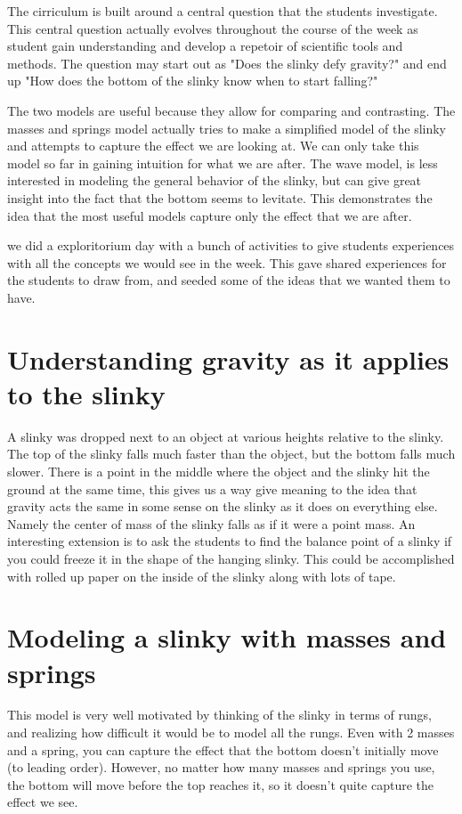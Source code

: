 \documentclass[aps,pre,10pt,superscriptaddress,showpacs,amsmath,amssymb,nofootinbib]{revtex4-1}
\begin{document}
The cirriculum is built around a central question that the students investigate.
 This central question actually evolves throughout the course of the week as
student gain understanding and develop a repetoir of scientific tools and
methods.  The question may start out as "Does the slinky defy gravity?" and end
up  "How does the bottom of the slinky know when to start falling?"

The two models are useful because they allow for comparing and contrasting. The
masses and springs model actually tries to make a simplified model of the slinky
and attempts to capture the effect we are looking at.  We can only take this
model so far in gaining intuition for what we are after.    The wave model, is
less interested in modeling the general behavior of the slinky, but can give
great insight into the fact that the bottom seems to levitate.  This
demonstrates the idea that the most useful  models  capture only the effect that
we are after.

we did a exploritorium day with a bunch of activities to give students
experiences with all the concepts we would see in the week.  This gave shared
experiences for the students to draw from, and seeded some of the ideas that we
wanted them to have.

\section{Understanding gravity as it applies to the slinky}
A slinky was dropped next to an object at various heights relative to the
slinky.  The top of the slinky falls much faster than the object, but the bottom
falls much slower.  There is a point in the middle where the object and the
slinky hit the ground at the same time, this gives us a way give meaning to the
idea that gravity acts the same in some sense on the slinky as it does on
everything else. Namely the center of mass of the slinky falls as if it were a
point mass. An interesting extension is to ask the students to find the balance
point of a slinky if you could freeze it in the shape of the hanging slinky. 
This could be accomplished with rolled up paper on the inside of the slinky
along with lots of tape.



\section{Modeling a slinky with masses and springs}

This model is very well motivated by thinking of the slinky in terms of rungs,
and realizing how difficult it would be to model all the rungs.  Even with 2
masses and a spring, you can capture the effect that the bottom doesn't
initially move (to leading order).  However, no matter how many masses and
springs you use, the bottom will move before the top reaches it, so it doesn't
quite capture the effect we see.
\end{document}
